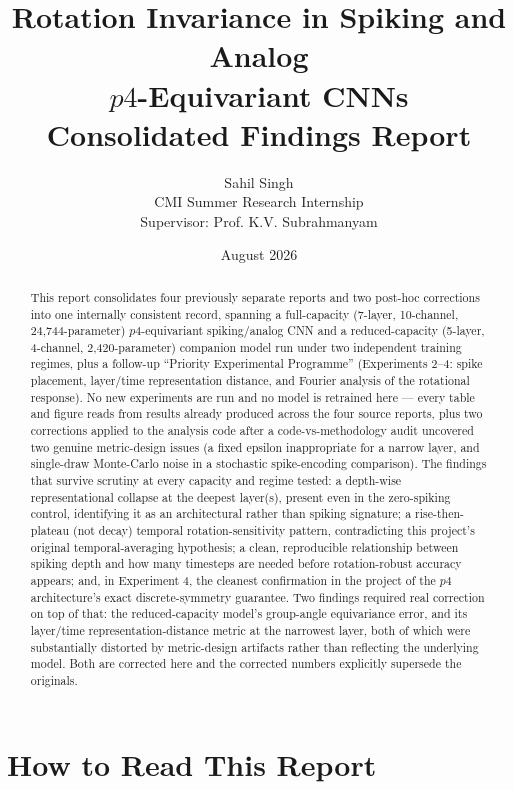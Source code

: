 \documentclass[11pt]{article}
\title{\Large Rotation Invariance in Spiking and Analog\\
$p4$-Equivariant CNNs\\[4pt]
\large Consolidated Findings Report}
\author{Sahil Singh\\
CMI Summer Research Internship\\
Supervisor: Prof. K.V. Subrahmanyam}
\date{August 2026}
\begin{document}
\maketitle

\begin{abstract}
This report consolidates four previously separate reports and two post-hoc corrections into one
internally consistent record, spanning a full-capacity (7-layer, 10-channel, 24{,}744-parameter) $p4$-equivariant
spiking/analog CNN and a reduced-capacity (5-layer, 4-channel, 2{,}420-parameter) companion model run
under two independent training regimes, plus a follow-up ``Priority Experimental Programme'' (Experiments
2--4: spike placement, layer/time representation distance, and Fourier analysis of the rotational response).
No new experiments are run and no model is retrained here --- every table and figure reads from results
already produced across the four source reports, plus two corrections applied to the analysis code
after a code-vs-methodology audit uncovered two genuine metric-design issues (a fixed epsilon
inappropriate for a narrow layer, and single-draw Monte-Carlo noise in a stochastic spike-encoding
comparison). The findings that survive scrutiny at every capacity and regime tested: a
depth-wise representational collapse at the deepest layer(s), present even in the zero-spiking control,
identifying it as an architectural rather than spiking signature; a rise-then-plateau (not decay)
temporal rotation-sensitivity pattern, contradicting this project's original temporal-averaging
hypothesis; a clean, reproducible relationship between spiking depth and how many timesteps are needed
before rotation-robust accuracy appears; and, in Experiment 4, the cleanest confirmation in the project
of the $p4$ architecture's exact discrete-symmetry guarantee. Two findings required real correction on
top of that: the reduced-capacity model's group-angle equivariance error, and its layer/time
representation-distance metric at the narrowest layer, both of which were substantially distorted by
metric-design artifacts rather than reflecting the underlying model. Both are corrected here and the
corrected numbers explicitly supersede the originals.
\end{abstract}

\tableofcontents

\section{How to Read This Report}
\label{sec:part0}
\end{document}
